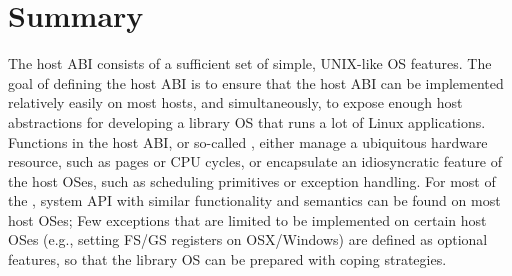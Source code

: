\section{Summary}
\label{sec:abi:summary}



The host ABI consists of a sufficient set of simple, UNIX-like OS features.
The goal of defining the host ABI
is to ensure that the host ABI can be implemented relatively easily on most hosts,
and simultaneously, to expose enough host abstractions for developing a library OS that runs a lot of Linux applications.
Functions in the host ABI,
or so-called \hostapis{},
either manage a ubiquitous hardware resource, such as pages or CPU cycles,
or encapsulate an idiosyncratic feature of the host OSes, such as scheduling primitives or exception handling.
For most of the \hostapis{}, system API with similar functionality and semantics
can be found on most host OSes;
Few exceptions that are limited to be implemented on certain host OSes
(e.g., setting FS/GS registers on OSX/Windows) are defined as optional features,
so that the library OS can be prepared with coping strategies.


